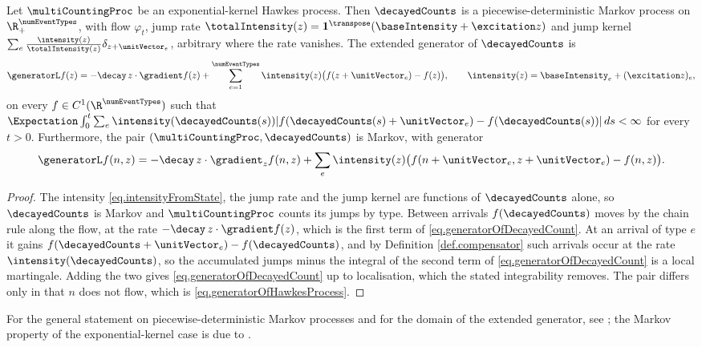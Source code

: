 \begin{thm}\label{thm.markovState}
 Let $\multiCountingProc$ be an exponential-kernel Hawkes process.
 Then $\decayedCounts$ is a piecewise-deterministic Markov process on
 $\R_{+}^{\numEventTypes}$,
 with flow $\varphi_t$,
 jump rate $\totalIntensity(z) = \mathbf{1}^{\transpose}(\baseIntensity + \excitation z)$
 and jump kernel
 $\sum_{e} \frac{\intensity(z)}{\totalIntensity(z)} \delta_{z + \unitVector_e}$,
 arbitrary where the rate vanishes.
 The extended generator of $\decayedCounts$ is
 \begin{equation}\label{eq.generatorOfDecayedCount}
  \generatorL f(z)
  = -\decay \, z \cdot \gradient f(z)
  + \sum_{e=1}^{\numEventTypes} \intensity(z)\big( f(z + \unitVector_e) - f(z) \big),
  \qquad \intensity(z) = \baseIntensity_e + (\excitation z)_e ,
 \end{equation}
 on every $f \in C^{1}(\R^{\numEventTypes})$ such that
 $\Expectation \int_{0}^{t} \sum_{e} \intensity(\decayedCounts(s))
 \lvert f(\decayedCounts(s) + \unitVector_e) - f(\decayedCounts(s)) \rvert \, ds < \infty$
 for every $t > 0$.
 Furthermore,
 the pair $(\multiCountingProc, \decayedCounts)$ is Markov,
 with generator
 \begin{equation}\label{eq.generatorOfHawkesProcess}
 \generatorL f(n,z) = -\decay \, z \cdot \gradient_{z} f(n,z)
 + \sum_{e} \intensity(z)\big( f(n + \unitVector_e, z + \unitVector_e) - f(n,z) \big) .
 \end{equation}
\end{thm}
\begin{proof}
 The intensity \eqref{eq.intensityFromState}, the jump rate and the jump kernel are functions
 of $\decayedCounts$ alone, so $\decayedCounts$ is Markov and $\multiCountingProc$ counts its
 jumps by type.
 Between arrivals $f(\decayedCounts)$ moves by the chain rule along the flow,
 at the rate $-\decay \, z \cdot \gradient f(z)$,
 which is the first term of \eqref{eq.generatorOfDecayedCount}.
 At an arrival of type $e$ it gains
 $f(\decayedCounts + \unitVector_e) - f(\decayedCounts)$,
 and by Definition \ref{def.compensator} such arrivals occur at the rate
 $\intensity(\decayedCounts)$,
 so the accumulated jumps minus the integral of the second term of
 \eqref{eq.generatorOfDecayedCount} is a local martingale.
 Adding the two gives \eqref{eq.generatorOfDecayedCount} up to localisation,
 which the stated integrability removes.
 The pair differs only in that $n$ does not flow,
 which is \eqref{eq.generatorOfHawkesProcess}.
\end{proof}
For the general statement on piecewise-deterministic Markov processes and for the domain of
the extended generator, see \cite[Theorem 5.5]{Dav84pie};
the Markov property of the exponential-kernel case is due to \cite{Oak75mar}.

